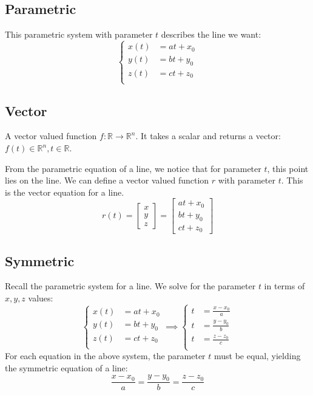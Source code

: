 \documentclass{article}
\begin{document}
\subsection{Parametric}

This parametric system with parameter $t$ describes the line we want:
\begin{equation*}
	\left\{\begin{aligned}
		x(t)&=at+x_0 \\
		y(t)&=bt+y_0 \\
		z(t)&=ct+z_0 \\
	\end{aligned}\right.
\end{equation*}

\subsection{Vector}

A vector valued function $f:\mathbb R\to \mathbb R^n$. It takes a scalar and returns a vector: $f(t)\in\mathbb R^n, t\in\mathbb R$.

From the parametric equation of a line, we notice that for parameter $t$, this point lies on the line. We can define a vector valued function $r$ with parameter $t$. This is the vector equation for a line.
\begin{equation*}
    r(t)
	=\begin{bmatrix}
		x \\ y \\ z
    \end{bmatrix}
	=\begin{bmatrix}
		at+x_0 \\
		bt+y_0 \\
		ct+z_0
	\end{bmatrix}
\end{equation*}

\subsection{Symmetric}

Recall the parametric system for a line. We solve for the parameter $t$ in terms of $x,y,z$ values:
\begin{equation*}
	\left\{\begin{aligned}
		x(t)&=at+x_0 \\
		y(t)&=bt+y_0 \\
		z(t)&=ct+z_0 \\
	\end{aligned}\right.
	\implies
	\left\{\begin{aligned}
		t&=\frac{x-x_0}{a} \\
		t&=\frac{y-y_0}{b} \\
		t&=\frac{z-z_0}{c} \\
	\end{aligned}\right.
\end{equation*}
For each equation in the above system, the parameter $t$ must be equal, yielding the symmetric equation of a line:
\begin{equation*}
    \frac{x-x_0}{a}=\frac{y-y_0}{b}=\frac{z-z_0}{c}
\end{equation*}
\end{document}
